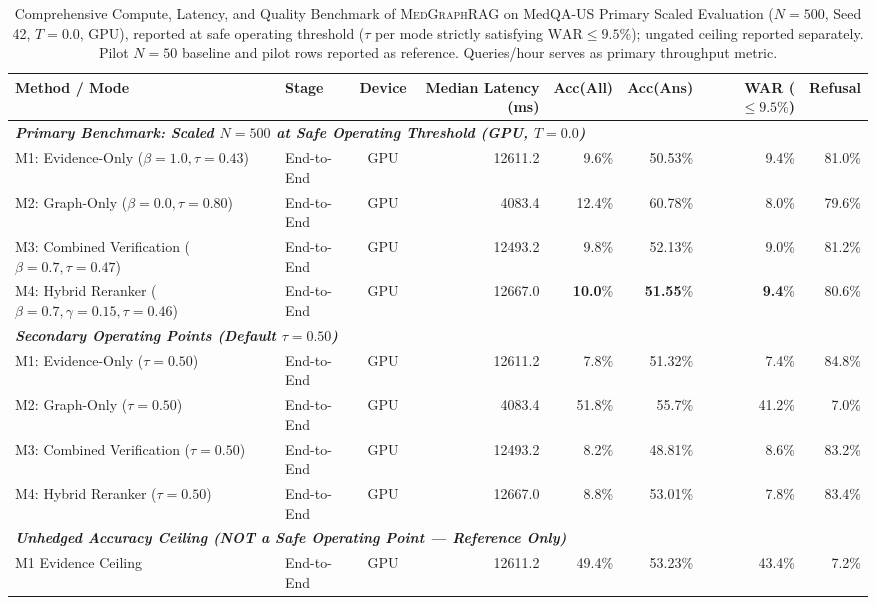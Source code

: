 \begin{table}[t]
\centering
\small
\caption{Comprehensive Compute, Latency, and Quality Benchmark of \textsc{MedGraphRAG} on MedQA-US Primary Scaled Evaluation ($N=500$, Seed 42, $T=0.0$, GPU), reported at safe operating threshold ($\tau$ per mode strictly satisfying $\text{WAR} \le 9.5\%$); ungated ceiling reported separately. Pilot $N=50$ baseline and pilot rows reported as reference. Queries/hour serves as primary throughput metric.}
\label{tab:compute_comparison_primary_n500}
\begin{tabular}{l l c r r r r r}
\toprule
\textbf{Method / Mode} & \textbf{Stage} & \textbf{Device} & \textbf{Median Latency (ms)} & \textbf{Acc(All)} & \textbf{Acc(Ans)} & \textbf{WAR ($\le 9.5\%$)} & \textbf{Refusal} \\
\midrule
\multicolumn{8}{l}{\textit{\textbf{Primary Benchmark: Scaled $N=500$ at Safe Operating Threshold (GPU, $T=0.0$)}}} \\
M1: Evidence-Only ($\beta=1.0, \tau=0.43$) & End-to-End & GPU & 12611.2 & 9.6\% & 50.53\% & 9.4\% & 81.0\% \\
M2: Graph-Only ($\beta=0.0, \tau=0.80$) & End-to-End & GPU & 4083.4 & 12.4\% & 60.78\% & 8.0\% & 79.6\% \\
M3: Combined Verification ($\beta=0.7, \tau=0.47$) & End-to-End & GPU & 12493.2 & 9.8\% & 52.13\% & 9.0\% & 81.2\% \\
M4: Hybrid Reranker ($\beta=0.7, \gamma=0.15, \tau=0.46$) & End-to-End & GPU & 12667.0 & \textbf{10.0}\% & \textbf{51.55}\% & \textbf{9.4}\% & 80.6\% \\
\midrule
\multicolumn{8}{l}{\textit{\textbf{Secondary Operating Points (Default $\tau=0.50$)}}} \\
M1: Evidence-Only ($\tau=0.50$) & End-to-End & GPU & 12611.2 & 7.8\% & 51.32\% & 7.4\% & 84.8\% \\
M2: Graph-Only ($\tau=0.50$) & End-to-End & GPU & 4083.4 & 51.8\% & 55.7\% & 41.2\% & 7.0\% \\
M3: Combined Verification ($\tau=0.50$) & End-to-End & GPU & 12493.2 & 8.2\% & 48.81\% & 8.6\% & 83.2\% \\
M4: Hybrid Reranker ($\tau=0.50$) & End-to-End & GPU & 12667.0 & 8.8\% & 53.01\% & 7.8\% & 83.4\% \\
\midrule
\multicolumn{8}{l}{\textit{\textbf{Unhedged Accuracy Ceiling (NOT a Safe Operating Point — Reference Only)}}} \\
M1 Evidence Ceiling & End-to-End & GPU & 12611.2 & 49.4\% & 53.23\% & 43.4\% & 7.2\% \\

\end{tabular}
\end{table}

